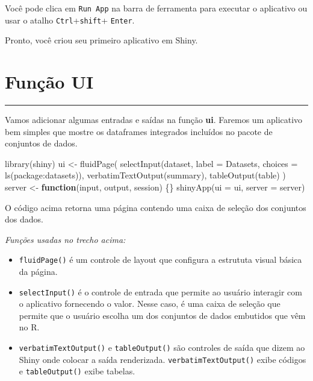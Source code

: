 \documentclass[
]{book}
\newenvironment{Shaded}{\begin{snugshade}}{\end{snugshade}}
\newcommand{\AttributeTok}[1]{\textcolor[rgb]{0.77,0.63,0.00}{#1}}
\newcommand{\ControlFlowTok}[1]{\textcolor[rgb]{0.13,0.29,0.53}{\textbf{#1}}}
\newcommand{\FunctionTok}[1]{\textcolor[rgb]{0.00,0.00,0.00}{#1}}
\newcommand{\NormalTok}[1]{#1}
\newcommand{\OtherTok}[1]{\textcolor[rgb]{0.56,0.35,0.01}{#1}}
\newcommand{\StringTok}[1]{\textcolor[rgb]{0.31,0.60,0.02}{#1}}
\begin{document}
Você pode clica em \texttt{Run\ App} na barra de ferramenta para executar o aplicativo ou usar o atalho \texttt{Ctrl}+\texttt{shift}+ \texttt{Enter}.

Pronto, você criou seu primeiro aplicativo em Shiny.

\hypertarget{funuxe7uxe3o-ui}{%
\chapter{\texorpdfstring{\textbf{Função UI}}{Função UI}}\label{funuxe7uxe3o-ui}}

\begin{center}\rule{0.5\linewidth}{0.5pt}\end{center}

Vamos adicionar algumas entradas e saídas na função \textbf{ui}. Faremos um aplicativo bem simples que mostre os dataframes integrados incluídos no pacote de conjuntos de dados.

\begin{Shaded}
\begin{Highlighting}[]
\FunctionTok{library}\NormalTok{(shiny)}
\NormalTok{ui }\OtherTok{\textless{}{-}} \FunctionTok{fluidPage}\NormalTok{(}
  \FunctionTok{selectInput}\NormalTok{(}\StringTok{\textquotesingle{}dataset\textquotesingle{}}\NormalTok{, }\AttributeTok{label =} \StringTok{\textquotesingle{}Datasets\textquotesingle{}}\NormalTok{, }\AttributeTok{choices =} \FunctionTok{ls}\NormalTok{(}\StringTok{\textquotesingle{}package:datasets\textquotesingle{}}\NormalTok{)),}
  \FunctionTok{verbatimTextOutput}\NormalTok{(}\StringTok{\textquotesingle{}summary\textquotesingle{}}\NormalTok{),}
  \FunctionTok{tableOutput}\NormalTok{(}\StringTok{\textquotesingle{}table\textquotesingle{}}\NormalTok{)}
\NormalTok{)}
\NormalTok{server }\OtherTok{\textless{}{-}} \ControlFlowTok{function}\NormalTok{(input, output, session) \{\}}
\FunctionTok{shinyApp}\NormalTok{(}\AttributeTok{ui =}\NormalTok{ ui, }\AttributeTok{server =}\NormalTok{ server)}
\end{Highlighting}
\end{Shaded}

O código acima retorna uma página contendo uma caixa de seleção dos conjuntos dos dados.

\emph{Funções usadas no trecho acima:}

\begin{itemize}
\item
  \texttt{fluidPage()} é um controle de layout que configura a estrututa visual básica da página.
\item
  \texttt{selectInput()} é o controle de entrada que permite ao usuário interagir com o aplicativo fornecendo o valor. Nesse caso, é uma caixa de seleção que permite que o usuário escolha um dos conjuntos de dados embutidos que vêm no R.
\item
  \texttt{verbatimTextOutput()} e \texttt{tableOutput()} são controles de saída que dizem ao Shiny onde colocar a saída renderizada. \texttt{verbatimTextOutput()} exibe códigos e \texttt{tableOutput()} exibe tabelas.
\end{itemize}
\end{document}
